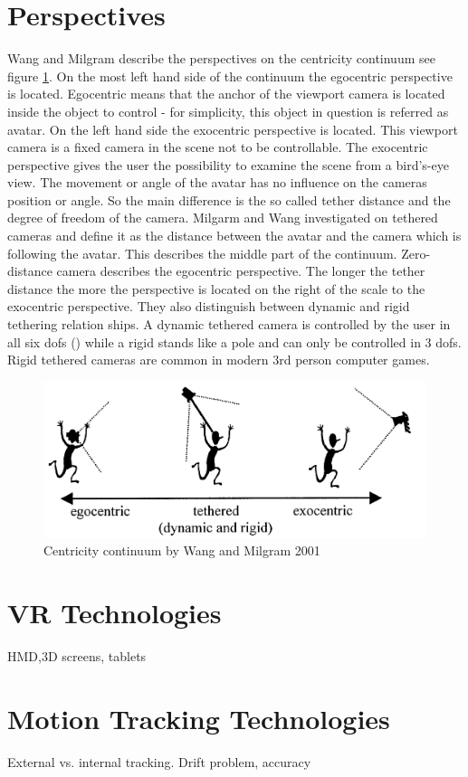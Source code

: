 \section{Perspectives}
Wang and Milgram \cite{Wang2001} describe the perspectives on the centricity continuum see figure \ref{fig:ego-exo-cont}. On the most left hand side of the continuum the egocentric perspective is located. Egocentric means that the anchor of the viewport camera is located inside the object to control - for simplicity, this object in question is referred as avatar. On the left hand side the exocentric perspective is located. This viewport camera is a fixed camera in the scene not to be controllable. The exocentric perspective gives the user the possibility to examine the scene from a bird's-eye view. The movement or angle of the avatar has no influence on the cameras position or angle. So the main difference is the so called tether distance and the degree of freedom of the camera. Milgarm and Wang investigated on tethered cameras and define it as the distance between the avatar and the camera which is following the avatar. This describes the middle part of the continuum. Zero-distance camera describes the egocentric perspective. The longer the tether distance the more the perspective is located on the right of the scale to the exocentric perspective. They also distinguish between dynamic and rigid tethering relation ships. A dynamic tethered camera is controlled by the user in all six dofs (\todo) while a rigid stands like a pole and can only be controlled in 3 dofs. Rigid tethered cameras are common in modern 3rd person computer games.
\begin{figure}
	\centering
		\includegraphics[width=1.0\textwidth]{img/ego_exo_continuum_bigger.PNG}
	\caption{Centricity continuum by Wang and Milgram 2001 \cite{Wang2001}}
	\label{fig:ego-exo-cont}
\end{figure}

\section{VR Technologies}
HMD,3D screens, tablets

\section{Motion Tracking Technologies}
External vs. internal tracking. Drift problem, accuracy